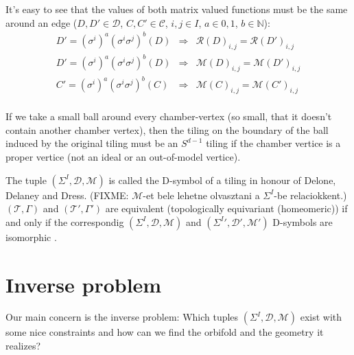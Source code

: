 \documentclass[12pt,a4paper]{article}
\begin{document}
It's easy to see that the values of both matrix valued functions must be the
same around an edge ($D,D'\in\mathcal{D}$, $C,C'\in\mathcal{C}$, $i,j\in I$,
$a\in {0,1}$, $b\in \mathbb{N}$):
\begin{eqnarray}
  D'=(\sigma^i)^a(\sigma^i\sigma^j)^b(D) & \Rightarrow &
  \mathcal{R}(D)_{i,j}=\mathcal{R}(D')_{i,j} \\
  D'=(\sigma^i)^a(\sigma^i\sigma^j)^b(D) & \Rightarrow &
  \mathcal{M}(D)_{i,j}=\mathcal{M}(D')_{i,j} \\
  C'=(\sigma^i)^a(\sigma^i\sigma^j)^b(C) & \Rightarrow &
  \mathcal{M}(C)_{i,j}=\mathcal{M}(C')_{i,j} \\
\end{eqnarray}

If we take a small ball around every chamber-vertex (so small, that it doesn't
contain another chamber vertex), then the tiling on the boundary of the ball
induced by the original tiling must be an $S^{d-1}$ tiling \cite{D87} if the
chamber vertice is a proper vertice (not an ideal or an out-of-model vertice).

The tuple $(\Sigma^I,\mathcal{D},\mathcal{M})$ is called the D-symbol of a
tiling in honour of Delone, Delaney and Dress. (FIXME: $\mathcal{M}$-et bele
lehetne olvasztani a $\Sigma^I$-be relaciokkent.) $(\mathcal{T},\Gamma)$ and
$(\mathcal{T}',\Gamma')$ are equivalent (topologically equivariant (homeomeric))
if and only if the correspondig $(\Sigma^I,\mathcal{D},\mathcal{M})$ and
$(\Sigma^I',\mathcal{D}',\mathcal{M}')$ D-symbols are isomorphic \cite{D87}.

\section{Inverse problem}
Our main concern is the inverse problem: Which tuples
$(\Sigma^I,\mathcal{D},\mathcal{M})$ exist with some nice constraints and how
can we find the orbifold and the geometry it realizes?
\end{document}

